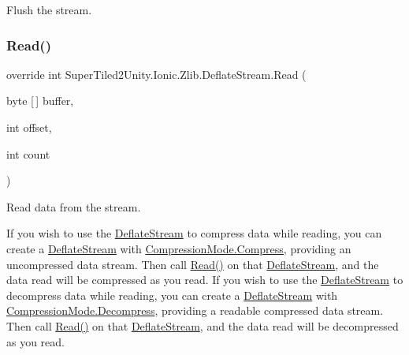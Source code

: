 Flush the stream. 

\mbox{\label{class_super_tiled2_unity_1_1_ionic_1_1_zlib_1_1_deflate_stream_a7adaf1072e4bc9be5914923eb2bc0636}} 
\subsubsection{\texorpdfstring{Read()}{Read()}}
{\footnotesize\ttfamily override int Super\+Tiled2\+Unity.\+Ionic.\+Zlib.\+Deflate\+Stream.\+Read (\begin{DoxyParamCaption}\item[{byte \mbox{[}$\,$\mbox{]}}]{buffer,  }\item[{int}]{offset,  }\item[{int}]{count }\end{DoxyParamCaption})}



Read data from the stream. 

If you wish to use the {\ttfamily \mbox{\hyperlink{class_super_tiled2_unity_1_1_ionic_1_1_zlib_1_1_deflate_stream}{Deflate\+Stream}}} to compress data while reading, you can create a {\ttfamily \mbox{\hyperlink{class_super_tiled2_unity_1_1_ionic_1_1_zlib_1_1_deflate_stream}{Deflate\+Stream}}} with {\ttfamily \mbox{\hyperlink{namespace_super_tiled2_unity_1_1_ionic_1_1_zlib_ad5b7635d92497e1c905e5de82eb1c6b1a8fa4fcfcda70410e089984d5f51ae97d}{Compression\+Mode.\+Compress}}}, providing an uncompressed data stream. Then call \mbox{\hyperlink{class_super_tiled2_unity_1_1_ionic_1_1_zlib_1_1_deflate_stream_a7adaf1072e4bc9be5914923eb2bc0636}{Read()}} on that {\ttfamily \mbox{\hyperlink{class_super_tiled2_unity_1_1_ionic_1_1_zlib_1_1_deflate_stream}{Deflate\+Stream}}}, and the data read will be compressed as you read. If you wish to use the {\ttfamily \mbox{\hyperlink{class_super_tiled2_unity_1_1_ionic_1_1_zlib_1_1_deflate_stream}{Deflate\+Stream}}} to decompress data while reading, you can create a {\ttfamily \mbox{\hyperlink{class_super_tiled2_unity_1_1_ionic_1_1_zlib_1_1_deflate_stream}{Deflate\+Stream}}} with {\ttfamily \mbox{\hyperlink{namespace_super_tiled2_unity_1_1_ionic_1_1_zlib_ad5b7635d92497e1c905e5de82eb1c6b1a6d2861192fdf4370bcf95c099be0f2f0}{Compression\+Mode.\+Decompress}}}, providing a readable compressed data stream. Then call \mbox{\hyperlink{class_super_tiled2_unity_1_1_ionic_1_1_zlib_1_1_deflate_stream_a7adaf1072e4bc9be5914923eb2bc0636}{Read()}} on that {\ttfamily \mbox{\hyperlink{class_super_tiled2_unity_1_1_ionic_1_1_zlib_1_1_deflate_stream}{Deflate\+Stream}}}, and the data read will be decompressed as you read. 

